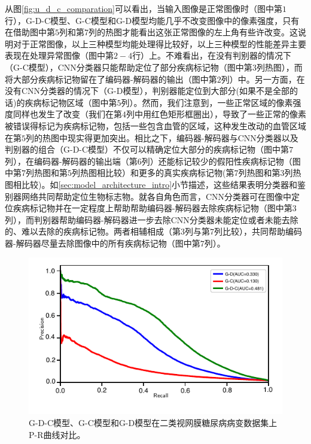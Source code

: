 从图\ref{fig:u_d_c_comparation}可以看出，当输入图像是正常图像时（图中第$1$行），G-D-C模型、G-C模型和G-D模型均能几乎不改变图像中的像素强度，只有在借助图中第$5$列和第$7$列的热图才能看出这张正常图像的左上角有些许改变。这说明对于正常图像，以上三种模型均能处理得比较好，以上三种模型的性能差异主要表现在处理异常图像（图中第$2-4$行）上。不难看出，在没有判别器的情况下（G-C模型），CNN分类器只能帮助定位了部分疾病标记物（图中第$3$列热图），而将大部分疾病标记物留在了编码器-解码器的输出（图中第$2$列）中。另一方面，在没有CNN分类器的情况下（G-D模型），判别器能定位到大部分(如果不是全部的话)的疾病标记物区域（图中第$5$列）。然而，我们注意到，一些正常区域的像素强度同样也发生了改变（我们在第$4$列中用红色矩形框圈出），导致了一些正常的像素被错误得标记为疾病标记物，包括一些包含血管的区域，这种发生改动的血管区域在第$5$列的热图中现实得更加突出。相比之下，编码器-解码器与CNN分类器以及判别器的组合（G-D-C模型）不仅可以精确定位大部分的疾病标记物（图中第$7$列），在编码器-解码器的输出端（第$6$列）还能标记较少的假阳性疾病标记物（图中第$7$列热图和第$5$列热图相比较）和更多的真实疾病标记物(第$7$列热图和第$3$列热图相比较)。如\ref{sec:model_architecture_intro}小节描述，这些结果表明分类器和鉴别器网络共同帮助定位生物标志物。就各自角色而言，CNN分类器可在图像中定位疾病标记物并在一定程度上帮助帮助编码器-解码器去除疾病标记物（图中第$3$列），而判别器帮助编码器-解码器进一步去除CNN分类器未能定位或者未能去除的、难以去除的疾病标记物。两者相辅相成（第$3$列与第$7$列比较），共同帮助编码器-解码器尽量去除图像中的所有疾病标记物（图中第$7$列）。
\begin{figure}[h]
	\centering
	\includegraphics[width=1.0\textwidth]{figure/pr_cureve_u_d_u_c_u_d_c_components.pdf}
	\caption[G-D-C模型、G-C模型和G-D模型P-R曲线对比]{G-D-C模型、G-C模型和G-D模型在二类视网膜糖尿病病变数据集上P-R曲线对比。}
	\label{fig:u_d_c_comparation_pr_curve}
\end{figure}

